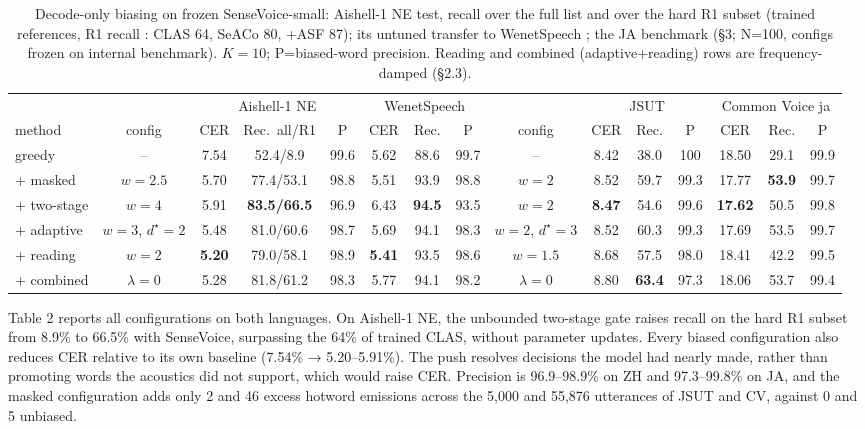 \documentclass{article}
\begin{document}
\begin{table}[tb]
\centering
\caption{Decode-only biasing on frozen SenseVoice-small: Aishell-1 NE test, recall over the full list and over the hard R1 subset (trained references, R1 recall \cite{shi2024seaco}: CLAS 64, SeACo 80, +ASF 87); its untuned transfer to WenetSpeech \cite{xu2023cb}; the JA benchmark (\S3; N=100, configs frozen on internal benchmark). $K{=}10$; P=biased-word precision. Reading and combined (adaptive+reading) rows are frequency-damped (\S2.3). }
\label{tab:main}
\footnotesize
\setlength{\tabcolsep}{3.2pt}
\begin{tabular}{l c ccc ccc c ccc ccc}
\toprule
& & \multicolumn{3}{c}{Aishell-1 NE} & \multicolumn{3}{c}{WenetSpeech} & & \multicolumn{3}{c}{JSUT} & \multicolumn{3}{c}{Common Voice ja} \\
\cmidrule(lr){3-5} \cmidrule(lr){6-8} \cmidrule(lr){10-12} \cmidrule(lr){13-15}
method & config & CER & Rec.\ all/R1 & P & CER & Rec. & P & config & CER & Rec. & P & CER & Rec. & P \\
\midrule
greedy      & --                       & 7.54 & 52.4/8.9 & 99.6 & 5.62 & 88.6 & 99.7 & --                       & 8.42 & 38.0 & 100 & 18.50 & 29.1 & 99.9 \\
+ masked    & $w{=}2.5$                & 5.70 & 77.4/53.1 & 98.8 & 5.51 & 93.9 & 98.8 & $w{=}2$                  & 8.52 & 59.7 & 99.3 & 17.77 & \textbf{53.9} & 99.7 \\
+ two-stage & $w{=}4$                  & 5.91 & \textbf{83.5/66.5} & 96.9 & 6.43 & \textbf{94.5} & 93.5 & $w{=}2$                  & \textbf{8.47} & 54.6 & 99.6 & \textbf{17.62} & 50.5 & 99.8 \\
+ adaptive  & $w{=}3$, $d^\star{=}2$   & 5.48 & 81.0/60.6 & 98.7 & 5.69 & 94.1 & 98.3 & $w{=}2$, $d^\star{=}3$   & 8.52 & 60.3 & 99.3 & 17.69 & 53.5 & 99.7 \\
+ reading   & $w{=}2$                  & \textbf{5.20} & 79.0/58.1 & 98.9 & \textbf{5.41} & 93.5 & 98.6 & $w{=}1.5$        & 8.68 & 57.5 & 98.0 & 18.41 & 42.2 & 99.5 \\
+ combined  & $\lambda{=}0$            & 5.28 & 81.8/61.2 & 98.3 & 5.77 & 94.1 & 98.2 & $\lambda{=}0$            & 8.80 & \textbf{63.4} & 97.3 & 18.06 & 53.7 & 99.4 \\
\bottomrule
\end{tabular}
\end{table}



Table 2 reports all configurations on both languages. On Aishell-1 NE, the unbounded two-stage gate raises recall on the hard R1 subset from 8.9\% to 66.5\% with SenseVoice, surpassing the 64\% of trained CLAS, without parameter updates. Every biased configuration also reduces CER relative to its own baseline (7.54\% → 5.20–5.91\%). The push resolves decisions the model had nearly made, rather than promoting words the acoustics did not support, which would raise CER. Precision is 96.9–98.9\% on ZH and 97.3–99.8\% on JA, and the masked configuration adds only 2 and 46 excess hotword emissions across the 5,000 and 55,876 utterances of JSUT and CV, against 0 and 5 unbiased.
\end{document}
